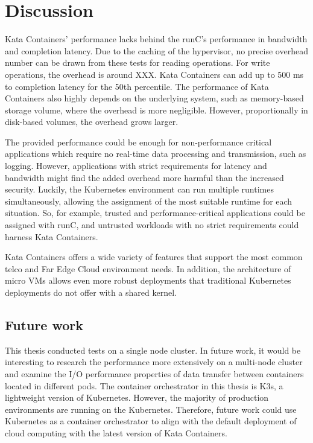 \chapter{Discussion}
\label{chapter:discussion}

Kata Containers' performance lacks behind the runC's performance in bandwidth and completion latency. Due to the caching of the hypervisor, no precise overhead number can be drawn from these tests for reading operations. For write operations, the overhead is around XXX.
Kata Containers can add up to 500 ms to completion latency for the 50th percentile. The performance of Kata Containers also highly depends on the underlying system, such as memory-based storage volume, where the overhead is more negligible. However, proportionally in disk-based volumes, the overhead grows larger.

The provided performance could be enough for non-performance critical applications which require no real-time data processing and transmission, such as logging. However, applications with strict requirements for latency and bandwidth might find the added overhead more harmful than the increased security. Luckily, the Kubernetes environment can run multiple runtimes simultaneously, allowing the assignment of the most suitable runtime for each situation. So, for example, trusted and performance-critical applications could be assigned with runC, and untrusted workloads with no strict requirements could harness Kata Containers.

Kata Containers offers a wide variety of features that support the most common telco and Far Edge Cloud environment needs. In addition, the architecture of micro VMs allows even more robust deployments that traditional Kubernetes deployments do not offer with a shared kernel.

\section{Future work}

This thesis conducted tests on a single node cluster. In future work, it would be interesting to research the performance more extensively on a multi-node cluster and examine the I/O performance properties of data transfer between containers located in different pods. The container orchestrator in this thesis is K3s, a lightweight version of Kubernetes. However, the majority of production environments are running on the Kubernetes. Therefore, future work could use Kubernetes as a container orchestrator to align with the default deployment of cloud computing with the latest version of Kata Containers.

